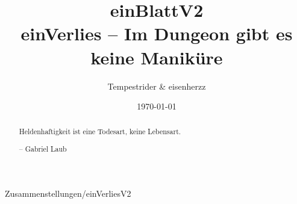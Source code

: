 \documentclass[11pt,a4paper]{scrreprt}
\date{\today}
\author{Tempestrider \& eisenherzz}
\title{\pik \karo einBlattV2\herz \kreuz \\
einVerlies -- Im Dungeon gibt es keine Maniküre}
\begin{document}
\maketitle

\begin{abstract}
Heldenhaftigkeit ist eine Todesart, keine Lebensart.

-- Gabriel Laub

\end{abstract}




\tableofcontents

 {Zusammenstellungen/einVerliesV2}

\listoftables


\end{document}
